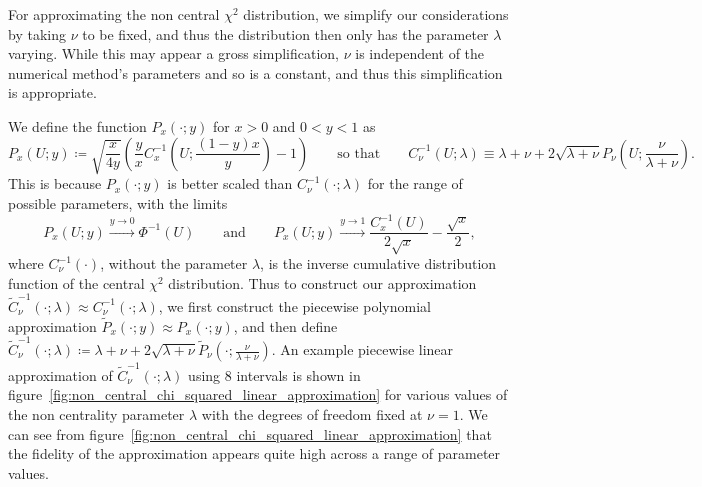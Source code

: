 \documentclass[manuscript,review]{acmart}
\begin{document}
For approximating the non central $ \chi^2 $ distribution, we simplify our considerations by taking $ \nu $ to be fixed, and thus the distribution then only has the parameter $ \lambda $ varying. While this may appear a gross simplification, $ \nu $ is independent of the numerical method's parameters and so is a constant, and thus this simplification is appropriate.

We define the function $ P_x(\cdot;y) $ for $ x > 0 $ and $ 0 < y < 1  $ as 
\begin{equation*}
P_x(U;y) \coloneqq \sqrt{\dfrac{x}{4y}} \left( \dfrac{y}{x}  C^{-1}_{x}\left(U; \dfrac{(1 - y)x}{y}\right) - 1\right)
\qquad \text{so that} \qquad 
C^{-1}_{\nu}(U;\lambda) \equiv \lambda + \nu + 2 \sqrt{\lambda + \nu} P_\nu\left(U;\dfrac{\nu}{\lambda + \nu}\right).
\end{equation*}
This is because $ P_x(\cdot;y) $ is better scaled than $ C^{-1}_{\nu}(\cdot;\lambda) $ for the range of possible parameters, with the limits
\begin{equation*}
P_x(U;y) \xrightarrow{y\to 0} \Phi^{-1}(U) 
\qquad \text{and} \qquad 
P_x(U;y) \xrightarrow{y\to 1} \dfrac{C^{-1}_x(U)}{2\sqrt{x}} - \dfrac{\sqrt{x}}{2},
\end{equation*}
where $ C^{-1}_\nu(\cdot) $, without the parameter $ \lambda $, is the inverse cumulative distribution function of the central $ \chi^2 $ distribution. Thus to construct our approximation $ \tilde{C}^{-1}_{\nu}(\cdot;\lambda) \approx C^{-1}_{\nu}(\cdot;\lambda) $, we first construct the piecewise polynomial approximation $ \tilde{P}_x(\cdot;y) \approx P_x(\cdot;y) $, and then define 
$ \tilde{C}^{-1}_{\nu}(\cdot;\lambda) \coloneqq \lambda + \nu + 2 \sqrt{\lambda + \nu} \tilde{P}_\nu(\cdot;\tfrac{\nu}{\lambda + \nu}) $. An example piecewise linear approximation of $  \tilde{C}^{-1}_{\nu}(\cdot;\lambda) $ using 8 intervals is shown in figure~\ref{fig:non_central_chi_squared_linear_approximation} for various values of the non centrality parameter $ \lambda $ with the degrees of freedom fixed at $ \nu = 1 $. We can see from figure~\ref{fig:non_central_chi_squared_linear_approximation} that the fidelity of the approximation appears quite high across a range of parameter values. 
\end{document}

